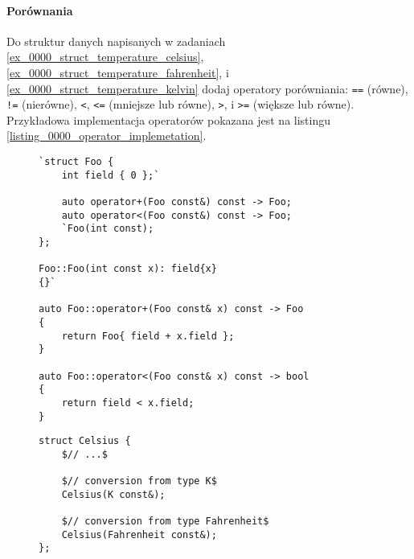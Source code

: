 \documentclass[11pt,a4paper,titlepage,onecolumn]{article}
\begin{document}
\paragraph{Porównania}\label{ex_0000_comparison_ops} Do struktur danych napisanych w zadaniach
\ref{ex_0000_struct_temperature_celsius},
\ref{ex_0000_struct_temperature_fahrenheit}, i
\ref{ex_0000_struct_temperature_kelvin} dodaj operatory porówniania:
\texttt{==} (równe),
\texttt{!=} (nierówne),
\texttt{<},
\texttt{<=} (mniejsze lub równe),
\texttt{>}, i
\texttt{>=} (większe lub równe).
Przykładowa implementacja operatorów pokazana jest na
listingu \ref{listing_0000_operator_implemetation}.

\begin{figure}
{\small
\begin{lstlisting}[caption={implementacja operatora},
    captionpos=b,
    label=listing_0000_operator_implemetation]
`struct Foo {
    int field { 0 };`

    auto operator+(Foo const&) const -> Foo;
    auto operator<(Foo const&) const -> Foo;
    `Foo(int const);
};

Foo::Foo(int const x): field{x}
{}`

auto Foo::operator+(Foo const& x) const -> Foo
{
    return Foo{ field + x.field };
}

auto Foo::operator<(Foo const& x) const -> bool
{
    return field < x.field;
}
\end{lstlisting}}
\end{figure}

\begin{figure}
{\small
\begin{lstlisting}[caption={konstruktory budujące temperaturę w °C z innych skal},
    captionpos=b,
    label=listing_0014_ctor_conversion]
struct Celsius {
    $// ...$

    $// conversion from type K$
    Celsius(K const&);

    $// conversion from type Fahrenheit$
    Celsius(Fahrenheit const&);
};
\end{lstlisting}}
\end{figure}
\end{document}

